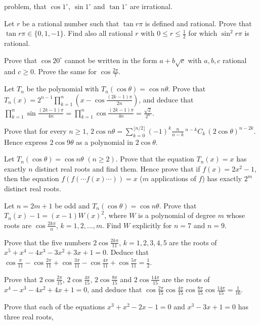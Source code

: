   problem, that $\cos1^\circ$, $\sin1^\circ$ and $\tan1^\circ$ are irrational.
\item Let $r$ be a rational number such that $\tan r\pi$ is defined and rational. Prove that $\tan
  r\pi\in\{0, 1, -1\}$. Find also all rational $r$ with $0\leq r\leq\frac{1}{2}$ for which $\sin^2r\pi$ is
  rational.
\item Prove that $\cos20^\circ$ cannot be written in the form $a + b\sqrt{c}$ with $a, b, c$ rational and
  $c\geq 0$. Prove the same for $\cos\frac{2\pi}{7}$.
\item Let $T_n$ be the polynomial with $T_n(\cos\theta) = \cos n\theta$. Prove that $T_n(x) = 2^{n -
  1}\displaystyle\prod_{k = 1}^{n}\left(x - \cos\frac{(2k - 1)\pi}{2n}\right)$, and deduce that
  $\displaystyle\prod_{k = 1}^{n}\sin\frac{(2k - 1)\pi}{4n} = \displaystyle\prod_{k = 1}^{n}\cos\frac{(2k -
    1)\pi}{4n} = \frac{\sqrt{2}}{2^n}$.
\item Prove that for every $n\geq 1$, $2\cos n\theta = \displaystyle\sum_{k = 0}^{\lfloor
    n/2\rfloor}(-1)^k\frac{n}{n - k}\,{}^{n - k}C_k\,(2\cos\theta)^{n - 2k}$. Hence express $2\cos9\theta$ as a
  polynomial in $2\cos\theta$.
\item Let $T_n(\cos\theta) = \cos n\theta$ $(n\geq 2)$. Prove that the equation $T_n(x) = x$ has exactly $n$
  distinct real roots and find them. Hence prove that if $f(x) = 2x^2 - 1$, then the equation
  $f(f(\cdots f(x)\cdots)) = x$ ($m$ applications of $f$) has exactly $2^m$ distinct real roots.
\item Let $n = 2m + 1$ be odd and $T_n(\cos\theta) = \cos n\theta$. Prove that $T_n(x) - 1 = (x - 1)W(x)^2$,
  where $W$ is a polynomial of degree $m$ whose roots are $\cos\frac{2k\pi}{n}$, $k = 1, 2, \ldots, m$. Find
  $W$ explicitly for $n = 7$ and $n = 9$.
\item Prove that the five numbers $2\cos\frac{2k\pi}{11}$, $k = 1, 2, 3, 4, 5$ are the roots of $x^5 + x^4 -
  4x^3 - 3x^2 + 3x + 1 = 0$. Deduce that $\cos\frac{\pi}{11} - \cos\frac{2\pi}{11} + \cos\frac{3\pi}{11}
  - \cos\frac{4\pi}{11} + \cos\frac{5\pi}{11} = \frac{1}{2}$.
\item Prove that $2\cos\frac{2\pi}{15}$, $2\cos\frac{4\pi}{15}$, $2\cos\frac{8\pi}{15}$ and
  $2\cos\frac{14\pi}{15}$ are the roots of $x^4 - x^3 - 4x^2 + 4x + 1 = 0$, and deduce that
  $\cos\frac{2\pi}{15}\cos\frac{4\pi}{15}\cos\frac{8\pi}{15}\cos\frac{14\pi}{15} = \frac{1}{16}$.
\item Prove that each of the equations $x^3 + x^2 - 2x - 1 = 0$ and $x^3 - 3x + 1 = 0$ has three real roots,
